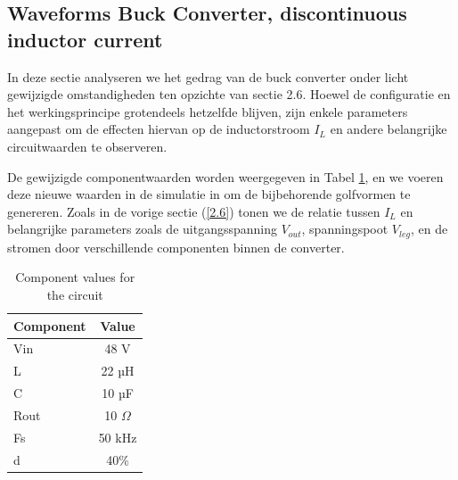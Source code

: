 \subsection{Waveforms Buck Converter, discontinuous inductor current}
In deze sectie analyseren we het gedrag van de buck converter onder licht gewijzigde omstandigheden ten opzichte van sectie 2.6. Hoewel de configuratie en het werkingsprincipe grotendeels hetzelfde blijven, zijn enkele parameters aangepast om de effecten hiervan op de inductorstroom \( I_L \) en andere belangrijke circuitwaarden te observeren. 

De gewijzigde componentwaarden worden weergegeven in Tabel \ref{tab:adjusted_component_values2}, en we voeren deze nieuwe waarden in de simulatie in om de bijbehorende golfvormen te genereren. Zoals in de vorige sectie (\autoref{2.6}) tonen we de relatie tussen \( I_L \) en belangrijke parameters zoals de uitgangsspanning \( V_{out} \), spanningspoot \( V_{leg} \), en de stromen door verschillende componenten binnen de converter.

\begin{table}[h!]
\centering
\begin{tabular}{|l|c|}
\hline
\textbf{Component} & \textbf{Value} \\ \hline
Vin & 48 V \\ \hline
L & 22 µH \\ \hline
C & 10 µF \\ \hline
Rout & 10 \(\Omega\) \\ \hline
Fs & 50 kHz \\ \hline
d & 40\% \\ \hline
\end{tabular}
\caption{Component values for the circuit}
\label{tab:adjusted_component_values2}
\end{table}

